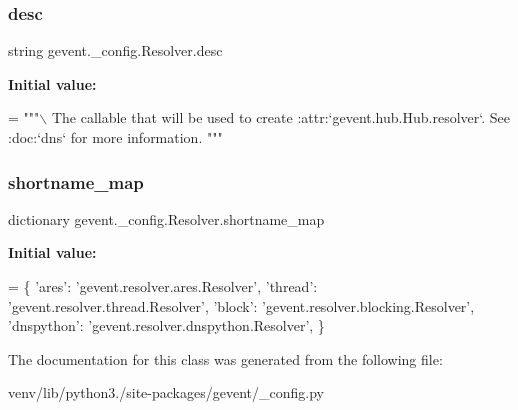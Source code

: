 \subsubsection{\texorpdfstring{desc}{desc}}
{\footnotesize\ttfamily string gevent.\+\_\+config.\+Resolver.\+desc\hspace{0.3cm}{\ttfamily [static]}}

{\bfseries Initial value\+:}
\begin{DoxyCode}
=  \textcolor{stringliteral}{"""\(\backslash\)}
\textcolor{stringliteral}{The callable that will be used to create}
\textcolor{stringliteral}{:attr:`gevent.hub.Hub.resolver`.}
\textcolor{stringliteral}{}
\textcolor{stringliteral}{See :doc:`dns` for more information.}
\textcolor{stringliteral}{"""}
\end{DoxyCode}
\mbox{\label{classgevent_1_1__config_1_1_resolver_a203528f1698dc7e9ea19a2d9671243da}} 
\subsubsection{\texorpdfstring{shortname\+\_\+map}{shortname\_map}}
{\footnotesize\ttfamily dictionary gevent.\+\_\+config.\+Resolver.\+shortname\+\_\+map\hspace{0.3cm}{\ttfamily [static]}}

{\bfseries Initial value\+:}
\begin{DoxyCode}
=  \{
        \textcolor{stringliteral}{'ares'}: \textcolor{stringliteral}{'gevent.resolver.ares.Resolver'},
        \textcolor{stringliteral}{'thread'}: \textcolor{stringliteral}{'gevent.resolver.thread.Resolver'},
        \textcolor{stringliteral}{'block'}: \textcolor{stringliteral}{'gevent.resolver.blocking.Resolver'},
        \textcolor{stringliteral}{'dnspython'}: \textcolor{stringliteral}{'gevent.resolver.dnspython.Resolver'},
    \}
\end{DoxyCode}


The documentation for this class was generated from the following file\+:\begin{DoxyCompactItemize}
\item 
venv/lib/python3./site-\/packages/gevent/\+\_\+config.\+py\end{DoxyCompactItemize}
